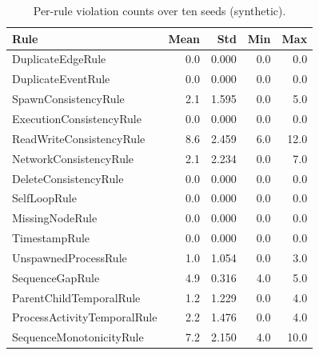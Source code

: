 \begin{table}[t]
\centering
\caption{Per-rule violation counts over ten seeds (synthetic).}
\label{tab:rules}
{\small
\begin{tabular}{p{5.2cm}rrrr}
\toprule
Rule & Mean & Std & Min & Max \\
\midrule
DuplicateEdgeRule & 0.0 & 0.000 & 0.0 & 0.0 \\
DuplicateEventRule & 0.0 & 0.000 & 0.0 & 0.0 \\
SpawnConsistencyRule & 2.1 & 1.595 & 0.0 & 5.0 \\
ExecutionConsistencyRule & 0.0 & 0.000 & 0.0 & 0.0 \\
ReadWriteConsistencyRule & 8.6 & 2.459 & 6.0 & 12.0 \\
NetworkConsistencyRule & 2.1 & 2.234 & 0.0 & 7.0 \\
DeleteConsistencyRule & 0.0 & 0.000 & 0.0 & 0.0 \\
SelfLoopRule & 0.0 & 0.000 & 0.0 & 0.0 \\
MissingNodeRule & 0.0 & 0.000 & 0.0 & 0.0 \\
TimestampRule & 0.0 & 0.000 & 0.0 & 0.0 \\
UnspawnedProcessRule & 1.0 & 1.054 & 0.0 & 3.0 \\
SequenceGapRule & 4.9 & 0.316 & 4.0 & 5.0 \\
ParentChildTemporalRule & 1.2 & 1.229 & 0.0 & 4.0 \\
ProcessActivityTemporalRule & 2.2 & 1.476 & 0.0 & 4.0 \\
SequenceMonotonicityRule & 7.2 & 2.150 & 4.0 & 10.0 \\
\bottomrule
\end{tabular}
}
\end{table}
